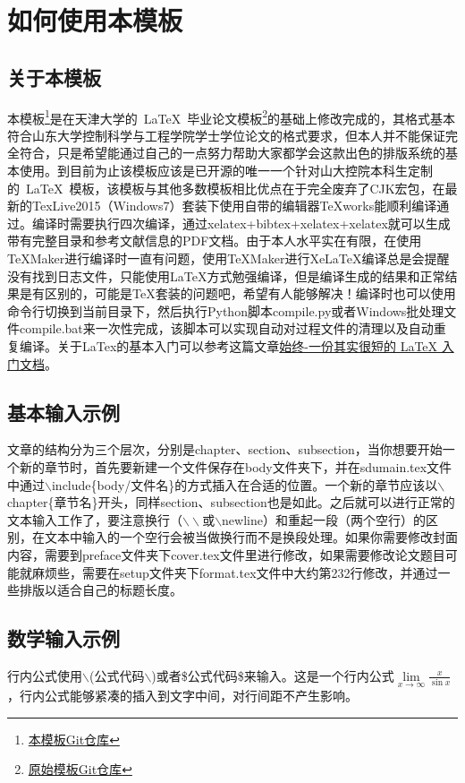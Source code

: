 \chapter{如何使用本模板}
\label{chap:howtouse}

\section{关于本模板}
本模板\footnote{\href{https://github.com/PlainSailing/SDUThesis}{本模板Git仓库}}是在天津大学的~\LaTeX{}~毕业论文模板\footnote{\href{https://github.com/xnth97/TJUThesisLatexTemplate}{原始模板Git仓库}}的基础上修改完成的，其格式基本符合山东大学控制科学与工程学院学士学位论文的格式要求，但本人并不能保证完全符合，只是希望能通过自己的一点努力帮助大家都学会这款出色的排版系统的基本使用。到目前为止该模板应该是已开源的唯一一个针对山大控院本科生定制的~\LaTeX{}~模板，该模板与其他多数模板相比优点在于完全废弃了CJK宏包，在最新的TexLive2015（Windows7）套装下使用自带的编辑器TeXworks能顺利编译通过。编译时需要执行四次编译，通过xelatex+bibtex+xelatex+xelatex就可以生成带有完整目录和参考文献信息的PDF文档。由于本人水平实在有限，在使用TeXMaker进行编译时一直有问题，使用TeXMaker进行XeLaTeX编译总是会提醒没有找到日志文件，只能使用LaTeX方式勉强编译，但是编译生成的结果和正常结果是有区别的，可能是TeX套装的问题吧，希望有人能够解决！编译时也可以使用命令行切换到当前目录下，然后执行Python脚本compile.py或者Windows批处理文件compile.bat来一次性完成，该脚本可以实现自动对过程文件的清理以及自动重复编译。关于LaTex的基本入门可以参考这篇文章\textcolor[rgb]{1.00,0.00,0.00}{\href{http://liam0205.me/2014/09/08/latex-introduction/}{始终-一份其实很短的 LaTeX 入门文档}}。
\section{基本输入示例}
文章的结构分为三个层次，分别是chapter、section、subsection，当你想要开始一个新的章节时，首先要新建一个文件保存在body文件夹下，并在sdumain.tex文件中通过$\backslash$include\{body/文件名\}的方式插入在合适的位置。一个新的章节应该以$\backslash$chapter\{章节名\}开头，同样section、subsection也是如此。之后就可以进行正常的文本输入工作了，要注意换行（$\backslash\backslash$或$\backslash$newline）和重起一段（两个空行）的区别，在文本中输入的一个空行会被当做换行而不是换段处理。如果你需要修改封面内容，需要到preface文件夹下cover.tex文件里进行修改，如果需要修改论文题目可能就麻烦些，需要在setup文件夹下format.tex文件中大约第232行修改，并通过一些排版以适合自己的标题长度。
\section{数学输入示例}
行内公式使用$\backslash$(\textcolor[rgb]{0,0,1}{公式代码}$\backslash$)或者\$\textcolor[rgb]{0,0,1}{公式代码}\$来输入。这是一个行内公式$\mathop {\lim }\limits_{x \to \infty } \frac{x}{{\sin x}}$，行内公式能够紧凑的插入到文字中间，对行间距不产生影响。


